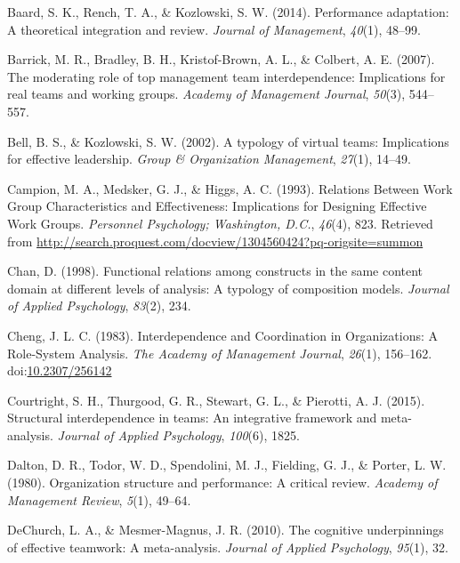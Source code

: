 \documentclass[english,,man]{apa6}
\theoremstyle{definition}
\theoremstyle{definition}
\theoremstyle{definition}
\theoremstyle{remark}
\begin{document}
\leavevmode\hypertarget{ref-baard_performance_2014}{}%
Baard, S. K., Rench, T. A., \& Kozlowski, S. W. (2014). Performance
adaptation: A theoretical integration and review. \emph{Journal of
Management}, \emph{40}(1), 48--99.

\leavevmode\hypertarget{ref-barrick_moderating_2007}{}%
Barrick, M. R., Bradley, B. H., Kristof-Brown, A. L., \& Colbert, A. E.
(2007). The moderating role of top management team interdependence:
Implications for real teams and working groups. \emph{Academy of
Management Journal}, \emph{50}(3), 544--557.

\leavevmode\hypertarget{ref-bell_typology_2002}{}%
Bell, B. S., \& Kozlowski, S. W. (2002). A typology of virtual teams:
Implications for effective leadership. \emph{Group \& Organization
Management}, \emph{27}(1), 14--49.

\leavevmode\hypertarget{ref-campion_relations_1993}{}%
Campion, M. A., Medsker, G. J., \& Higgs, A. C. (1993). Relations
Between Work Group Characteristics and Effectiveness: Implications for
Designing Effective Work Groups. \emph{Personnel Psychology; Washington,
D.C.}, \emph{46}(4), 823. Retrieved from
\url{http://search.proquest.com/docview/1304560424?pq-origsite=summon}

\leavevmode\hypertarget{ref-chan_functional_1998}{}%
Chan, D. (1998). Functional relations among constructs in the same
content domain at different levels of analysis: A typology of
composition models. \emph{Journal of Applied Psychology}, \emph{83}(2),
234.

\leavevmode\hypertarget{ref-cheng_interdependence_1983}{}%
Cheng, J. L. C. (1983). Interdependence and Coordination in
Organizations: A Role-System Analysis. \emph{The Academy of Management
Journal}, \emph{26}(1), 156--162.
doi:\href{https://doi.org/10.2307/256142}{10.2307/256142}

\leavevmode\hypertarget{ref-courtright_structural_2015}{}%
Courtright, S. H., Thurgood, G. R., Stewart, G. L., \& Pierotti, A. J.
(2015). Structural interdependence in teams: An integrative framework
and meta-analysis. \emph{Journal of Applied Psychology}, \emph{100}(6),
1825.

\leavevmode\hypertarget{ref-dalton_organization_1980}{}%
Dalton, D. R., Todor, W. D., Spendolini, M. J., Fielding, G. J., \&
Porter, L. W. (1980). Organization structure and performance: A critical
review. \emph{Academy of Management Review}, \emph{5}(1), 49--64.

\leavevmode\hypertarget{ref-dechurch2010cognitive}{}%
DeChurch, L. A., \& Mesmer-Magnus, J. R. (2010). The cognitive
underpinnings of effective teamwork: A meta-analysis. \emph{Journal of
Applied Psychology}, \emph{95}(1), 32.
\end{document}
